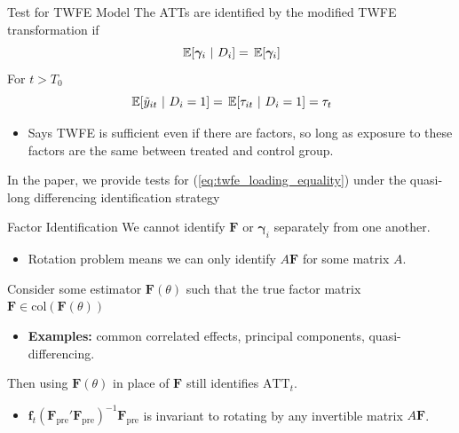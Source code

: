 \documentclass[aspectratio=169,t,11pt]{beamer}
\begin{document}
\begin{frame}{Test for TWFE Model}\label{slide:twfe_test}
  The ATTs are identified by the modified TWFE transformation if
  \begin{equation}\label{eq:twfe_loading_equality}
    \expec{\bm{\gamma}_i}{D_i} = \expec{\bm{\gamma}_i}
  \end{equation}
  For $t > T_0$
  $$
    \expec{\tilde{y}_{it}}{D_i = 1} = \expec{\tau_{it}}{D_i = 1} = \tau_t
  $$
  
  \begin{itemize}
    \item Says TWFE is sufficient even if there are factors, so long as exposure to these factors are the same between treated and control group.
  \end{itemize}

  
  \medskip
  In the paper, we provide tests for (\ref{eq:twfe_loading_equality}) under the quasi-long differencing identification strategy

\end{frame}

\begin{frame}{Factor Identification}\label{slide:appendix-column_span_condition}
  We cannot identify $\bm F$ or $\bm{\gamma}_i$ separately from one another. 
  \begin{itemize}
    \item Rotation problem means we can only identify $A \bm F$ for some matrix $A$.
  \end{itemize}

  \medskip
  Consider some estimator $\bm{F}(\theta)$ such that the true factor matrix $\bm{F} \in \text{col}(\bm{F}(\theta))$
  \begin{itemize}
    \item \textbf{Examples:} common correlated effects, principal components, quasi-differencing.
  \end{itemize}

  \smallskip
  Then using $\bm{F}(\theta)$ in place of $\bm{F}$ still identifies $\text{ATT}_t$.
  \begin{itemize}
    \item $\bm{f}_t (\bm{F}_{\text{pre}}' \bm{F}_{\text{pre}})^{-1} \bm{F}_{\text{pre}}$ is invariant to rotating by any invertible matrix $A \bm{F}$.
  \end{itemize}

\end{frame}
\end{document}
